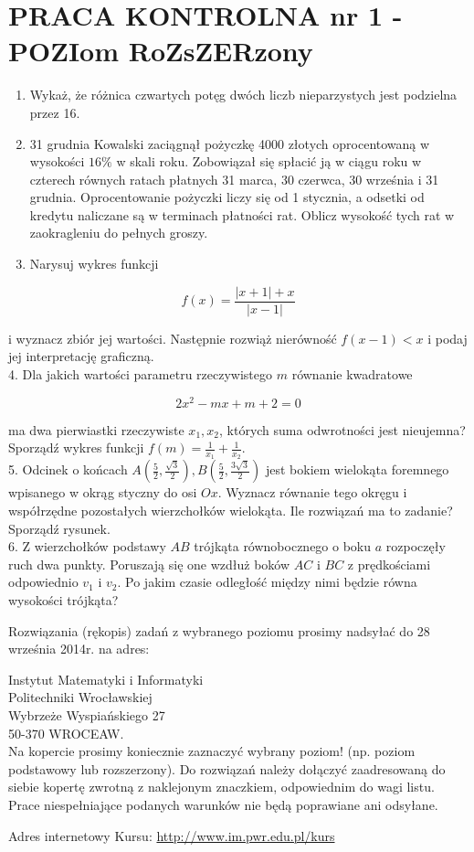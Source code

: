 \documentclass[10pt]{article}
\begin{document}
\section*{PRACA KONTROLNA nr 1 - POZIom RoZsZERzony}
\begin{enumerate}
  \item Wykaż, że różnica czwartych potęg dwóch liczb nieparzystych jest podzielna przez 16.
  \item 31 grudnia Kowalski zaciągnął pożyczkę 4000 złotych oprocentowaną w wysokości $16 \%$ w skali roku. Zobowiązał się spłacić ją w ciągu roku w czterech równych ratach płatnych 31 marca, 30 czerwca, 30 września i 31 grudnia. Oprocentowanie pożyczki liczy się od 1 stycznia, a odsetki od kredytu naliczane są w terminach płatności rat. Oblicz wysokość tych rat w zaokragleniu do pełnych groszy.
  \item Narysuj wykres funkcji
\end{enumerate}

$$
f(x)=\frac{|x+1|+x}{|x-1|}
$$

i wyznacz zbiór jej wartości. Następnie rozwiąż nierówność $f(x-1)<x$ i podaj jej interpretację graficzną.\\
4. Dla jakich wartości parametru rzeczywistego $m$ równanie kwadratowe

$$
2 x^{2}-m x+m+2=0
$$

ma dwa pierwiastki rzeczywiste $x_{1}, x_{2}$, których suma odwrotności jest nieujemna? Sporządź wykres funkcji $f(m)=\frac{1}{x_{1}}+\frac{1}{x_{2}}$.\\
5. Odcinek o końcach $A\left(\frac{5}{2}, \frac{\sqrt{3}}{2}\right), B\left(\frac{5}{2}, \frac{3 \sqrt{3}}{2}\right)$ jest bokiem wielokąta foremnego wpisanego w okrąg styczny do osi $O x$. Wyznacz równanie tego okręgu i współrzędne pozostałych wierzchołków wielokąta. Ile rozwiązań ma to zadanie? Sporządź rysunek.\\
6. Z wierzchołków podstawy $A B$ trójkąta równobocznego o boku $a$ rozpoczęły ruch dwa punkty. Poruszają się one wzdłuż boków $A C$ i $B C$ z prędkościami odpowiednio $v_{1}$ i $v_{2}$. Po jakim czasie odległość między nimi będzie równa wysokości trójkąta?

Rozwiązania (rękopis) zadań z wybranego poziomu prosimy nadsyłać do 28 września 2014r. na adres:

Instytut Matematyki i Informatyki\\
Politechniki Wrocławskiej\\
Wybrzeże Wyspiańskiego 27\\
50-370 WROCEAW.\\
Na kopercie prosimy koniecznie zaznaczyć wybrany poziom! (np. poziom podstawowy lub rozszerzony). Do rozwiązań należy dołączyć zaadresowaną do siebie kopertę zwrotną z naklejonym znaczkiem, odpowiednim do wagi listu. Prace niespełniające podanych warunków nie będą poprawiane ani odsyłane.

Adres internetowy Kursu: \href{http://www.im.pwr.edu.pl/kurs}{http://www.im.pwr.edu.pl/kurs}
\end{document}
